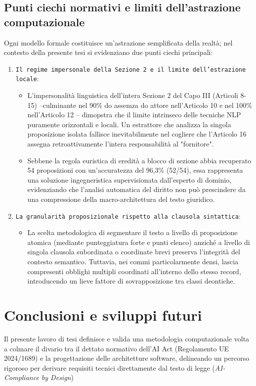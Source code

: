 \documentclass[12pt,a4paper,oneside]{report}
\begin{document}
\subsection{Punti ciechi normativi e limiti dell'astrazione computazionale}
Ogni modello formale costituisce un'astrazione semplificata della realtà; nel contesto della presente tesi si evidenziano due punti ciechi principali:
\begin{enumerate}
    \item \texttt{Il regime impersonale della Sezione 2 e il limite dell'estrazione locale}:
    \begin{itemize}
        \item L'impersonalità linguistica dell'intera Sezione 2 del Capo III (Articoli 8-15) --culminante nel 90\% do assemza do attore nell'Articolo 10 e nel 100\% nell'Articolo 12 -- dimopstra che il limite intrinseco delle tecniche NLP puramente orizzontali e locali. Un estrattore che analizza la singola proposizione isolata fallisce inevitabilmente nel cogliere che l'Articolo 16 assegna retroattivamente l'intera responsabilità al "fornitore".
        \item Sebbene la regola euristica di eredità a blocco di sezione abbia recuperato 54 proposizioni con un'accuratezza del 96,3\% (52/54), essa rappresenta una soluzione ingegneristica supervisionata dall'esperto di dominio, evidenziando che l'analisi automatica del diritto non può prescindere da una compressione della macro-architettura del testo giuridico.
    \end{itemize}
    \item \texttt{La granularità proposizionale rispetto alla clausola sintattica}:
    \begin{itemize}
        \item La scelta metodologica di segmentare il testo a livello di proposizione atomica (mediante punteggiatura forte e punti elenco) anziché a livello di singola clausola subordinata o coordinate brevi preserva l'integrità del contesto semantico. Tuttavia, nei commi particolarmente densi, lascia compresenti obblighi multipli coordinati all'interno dello stesso record, introducendo un lieve fattore di sovrapposizione tra classi deontiche.
    \end{itemize}
\end{enumerate}


\section{Conclusioni e sviluppi futuri}
Il presente lavoro di tesi definisce e valida una metodologia computazionale volta a colmare il divario tra il dettato normativo dell'AI Act (Regolamento UE 2024/1689) e la progettazione delle architetture software, delineando un percorso rigoroso per derivare requisiti tecnici direttamente dal testo di legge (\emph{AI-Compliance by Design})
\end{document}
